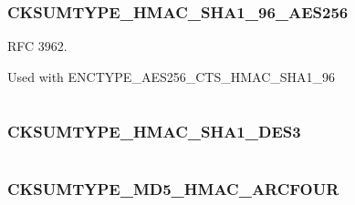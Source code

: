 \documentclass[letterpaper,10pt,english]{sphinxmanual}
\begin{document}
\subsubsection{CKSUMTYPE\_HMAC\_SHA1\_96\_AES256}
\label{appdev/refs/macros/CKSUMTYPE_HMAC_SHA1_96_AES256::doc}\label{appdev/refs/macros/CKSUMTYPE_HMAC_SHA1_96_AES256:cksumtype-hmac-sha1-96-aes256}\label{appdev/refs/macros/CKSUMTYPE_HMAC_SHA1_96_AES256:cksumtype-hmac-sha1-96-aes256-data}

\begin{fulllineitems}
\label{appdev/refs/macros/CKSUMTYPE_HMAC_SHA1_96_AES256:CKSUMTYPE_HMAC_SHA1_96_AES256}
\end{fulllineitems}


RFC 3962.

Used with ENCTYPE\_AES256\_CTS\_HMAC\_SHA1\_96

\begin{tabulary}{\linewidth}{|L|L|}
\hline

 & 
\\
\hline\end{tabulary}



\subsubsection{CKSUMTYPE\_HMAC\_SHA1\_DES3}
\label{appdev/refs/macros/CKSUMTYPE_HMAC_SHA1_DES3::doc}\label{appdev/refs/macros/CKSUMTYPE_HMAC_SHA1_DES3:cksumtype-hmac-sha1-des3}\label{appdev/refs/macros/CKSUMTYPE_HMAC_SHA1_DES3:cksumtype-hmac-sha1-des3-data}

\begin{fulllineitems}
\label{appdev/refs/macros/CKSUMTYPE_HMAC_SHA1_DES3:CKSUMTYPE_HMAC_SHA1_DES3}
\end{fulllineitems}


\begin{tabulary}{\linewidth}{|L|L|}
\hline

 & 
\\
\hline\end{tabulary}



\subsubsection{CKSUMTYPE\_MD5\_HMAC\_ARCFOUR}
\label{appdev/refs/macros/CKSUMTYPE_MD5_HMAC_ARCFOUR:cksumtype-md5-hmac-arcfour}\label{appdev/refs/macros/CKSUMTYPE_MD5_HMAC_ARCFOUR:cksumtype-md5-hmac-arcfour-data}\label{appdev/refs/macros/CKSUMTYPE_MD5_HMAC_ARCFOUR::doc}
\end{document}
